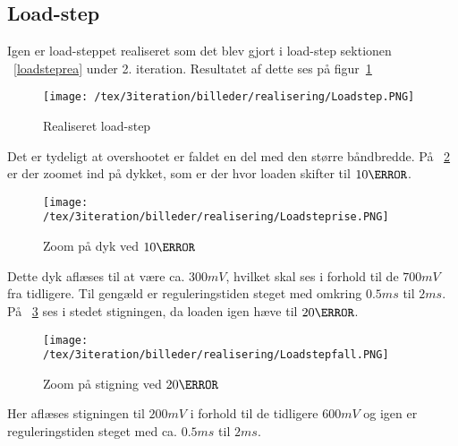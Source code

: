 \subsection{Load-step}
Igen er load-steppet realiseret som det blev gjort i load-step sektionen ~\ref{loadsteprea} under 2. iteration. Resultatet af dette ses på figur~\ref{fig:Loadstep3}
\begin{figure}[H]
	\center
	\texttt{[image: /tex/3iteration/billeder/realisering/Loadstep.PNG]}
	\caption{Realiseret load-step}
	\label{fig:Loadstep3}
\end{figure} 
\noindent Det er tydeligt at overshootet er faldet en del med den større båndbredde. På ~\ref{fig:Loadsteprise} er der zoomet ind på dykket, som er der hvor loaden skifter til $10\ohm$.
\begin{figure}[H]
	\center
	\texttt{[image: /tex/3iteration/billeder/realisering/Loadsteprise.PNG]}
	\caption{Zoom på dyk ved $10\ohm$}
	\label{fig:Loadsteprise}
\end{figure}

\noindent Dette dyk aflæses til at være ca. $300mV$, hvilket skal ses i forhold til de $700mV$ fra tidligere. Til gengæld er reguleringstiden steget med omkring $0.5ms$ til $2ms$. På ~\ref{fig:Loadstepfall} ses i stedet stigningen, da loaden igen hæve til $20\ohm$.
\begin{figure}[H]
	\center
	\texttt{[image: /tex/3iteration/billeder/realisering/Loadstepfall.PNG]}
	\caption{Zoom på stigning ved $20\ohm$}
	\label{fig:Loadstepfall}
\end{figure}

\noindent Her aflæses stigningen til $200mV$ i forhold til de tidligere $600mV$ og igen er reguleringstiden steget med ca. $0.5ms$ til $2ms$. 